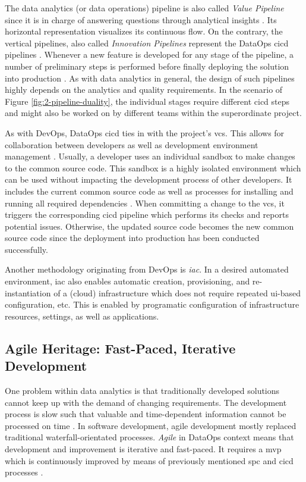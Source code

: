 The data analytics (or data operations) pipeline is also called \textit{Value Pipeline} since it is in charge of answering questions through analytical insights \cite[32\psq]{Bergh2019}. Its horizontal representation visualizes its continuous flow. On the contrary, the vertical pipelines, also called \textit{Innovation Pipelines} represent the DataOps \ac{cicd} pipelines \cite[66]{Schmidt2019}. Whenever a new feature is developed for any stage of the pipeline, a number of preliminary steps is performed before finally deploying the solution into production \cite[33]{Bergh2019}. As with data analytics in general, the design of such pipelines highly depends on the analytics and quality requirements. In the scenario of Figure \ref{fig:2-pipeline-duality}, the individual stages require different \ac{cicd} steps and might also be worked on by different teams within the superordinate project.

As with DevOps, DataOps \ac{cicd} ties in with the project's \acf{vcs}. This allows for collaboration between developers as well as development environment management \cite{Davis2020}. Usually, a developer uses an individual sandbox to make changes to the common source code. This sandbox is a highly isolated environment which can be used without impacting the development process of other developers. It includes the current common source code as well as processes for installing and running all required dependencies \cite[41]{Bergh2019}. When committing a change to the \ac{vcs}, it triggers the corresponding \ac{cicd} pipeline which performs its checks and reports potential issues. Otherwise, the updated source code becomes the new common source code since the deployment into production has been conducted successfully.

Another methodology originating from DevOps is \textit{\ac{iac}}. In a desired automated environment, \ac{iac} also enables automatic creation, provisioning, and re-instantiation of a (cloud) infrastructure \cite[8\psqq]{Chaganti2018} which does not require repeated \ac{ui}-based configuration, etc. This is enabled by programatic configuration of infrastructure resources, settings, as well as applications.

\subsection{Agile Heritage: Fast-Paced, Iterative Development}
One problem within data analytics is that traditionally developed solutions cannot keep up with the demand of changing requirements. The development process is slow such that valuable and time-dependent information cannot be processed on time \cite{Lockner2019}. In software development, agile development mostly replaced traditional waterfall-orientated processes. \textit{Agile} in DataOps context means that development and improvement is iterative and fast-paced. It requires a \ac{mvp} which is continuously improved by means of previously mentioned \ac{spc} and \ac{cicd} processes \cite[19\psq]{Bergh2019}.
